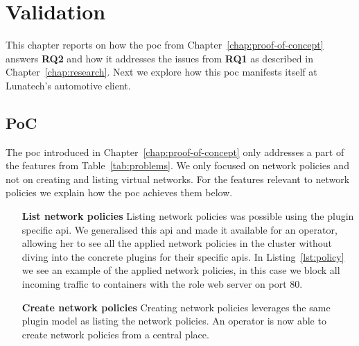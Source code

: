 \chapter{Validation}
\label{chap:validation}
This chapter reports on how the \gls{poc} from Chapter~\ref{chap:proof-of-concept} answers \textbf{RQ2} and how it addresses the issues from \textbf{RQ1} as described in Chapter~\ref{chap:research}. Next we explore how this \gls{poc} manifests itself at Lunatech's automotive client.

\section{PoC}
The \gls{poc} introduced in Chapter~\ref{chap:proof-of-concept} only addresses a part of the features from Table~\ref{tab:problems}. We only focused on network policies and not on creating and listing virtual networks. For the features relevant to network policies we explain how the \gls{poc} achieves them below.
\begin{itemize}
    \item[\textbf{List network policies}] Listing network policies was possible using the plugin specific \gls{api}. We generalised this \gls{api} and made it available for an operator, allowing her to see all the applied network policies in the cluster without diving into the concrete plugins for their specific \glspl{api}. In Listing~\ref{lst:policy} we see an example of the applied network policies, in this case we block all incoming traffic to containers with the role web server on port 80.
    \item[\textbf{Create network policies}] Creating network policies leverages the same plugin model as listing the network policies. An operator is now able to create network policies from a central place.
\end{itemize}


